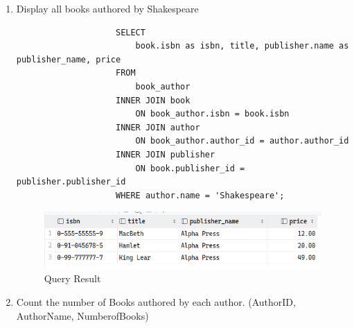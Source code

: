 \documentclass[12pt,titlepage]{article}
\begin{document}
\begin{enumerate}
{\begin{enumerate}
{\begin{verbatim}
                    CREATE TABLE author
                    (
                        author_id INT          NOT NULL PRIMARY KEY,
                        name      VARCHAR(255) NOT NULL,
                        phone     VARCHAR(255) NOT NULL
                    );

                    CREATE TABLE book_author
                    (
                        isbn      CHAR(13) NOT NULL,
                        author_id INT      NOT NULL
                    );

                    CREATE TABLE publisher
                    (
                        publisher_id INT          NOT NULL PRIMARY KEY,
                        name         VARCHAR(255) NOT NULL,
                        phone        VARCHAR(255) NOT NULL
                    );

                    ALTER TABLE book
                        ADD FOREIGN KEY (publisher_id) REFERENCES publisher (publisher_id);
                    ALTER TABLE book_author
                        ADD FOREIGN KEY (isbn) REFERENCES book (isbn);
                    ALTER TABLE book_author
                        ADD FOREIGN KEY (author_id) REFERENCES author (author_id);
                \end{verbatim}
            }
            \pagebreak
            \item {
                Display all books authored by Shakespeare

                \begin{verbatim}
                    SELECT
                        book.isbn as isbn, title, publisher.name as publisher_name, price
                    FROM
                        book_author
                    INNER JOIN book
                        ON book_author.isbn = book.isbn
                    INNER JOIN author
                        ON book_author.author_id = author.author_id
                    INNER JOIN publisher
                        ON book.publisher_id = publisher.publisher_id
                    WHERE author.name = 'Shakespeare';
                \end{verbatim}

                \begin{figure}[h]
                    \centering
                    \includegraphics[width=.75\textwidth]{images/q1.png}
                    \caption{Query Result}
                \end{figure}
            }
            \pagebreak
            \item {
                Count the number of Books authored by each author. (AuthorID, AuthorName, NumberofBooks)

}
\end{enumerate}}
\end{enumerate}
\end{document}
